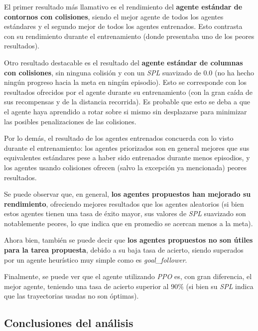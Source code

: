 \newpage

El primer resultado más llamativo es el rendimiento del \textbf{agente estándar de contornos con colisiones}, siendo el mejor agente de todos los agentes estándares y el segundo mejor de todos los agentes entrenados. Esto contrasta con su rendimiento durante el entrenamiento (donde presentaba uno de los peores resultados).

Otro resultado destacable es el resultado del \textbf{agente estándar de columnas con colisiones}, sin ninguna colisión y con un \textit{SPL} suavizado de 0.0 (no ha hecho ningún progreso hacia la meta en ningún episodio). Esto se corresponde con los resultados ofrecidos por el agente durante su entrenamiento (con la gran caída de sus recompensas y de la distancia recorrida). Es probable que esto se deba a que el agente haya aprendido a rotar sobre si mismo sin desplazarse para minimizar las posibles penalizaciones de las colisiones.

Por lo demás, el resultado de los agentes entrenados concuerda con lo visto durante el entrenamiento: los agentes priorizados son en general mejores que sus equivalentes estándares pese a haber sido entrenados durante menos episodios, y los agentes usando colisiones ofrecen (salvo la excepción ya mencionada) peores resultados.

Se puede observar que, en general, \textbf{los agentes propuestos han mejorado su rendimiento}, ofreciendo mejores resultados que los agentes aleatorios (si bien estos agentes tienen una tasa de éxito mayor, sus valores de \textit{SPL} suavizado son notablemente peores, lo que indica que en promedio se acercan menos a la meta).

Ahora bien, también se puede decir que \textbf{los agentes propuestos no son útiles para la tarea propuesta}, debido a su baja tasa de acierto, siendo superados por un agente heurístico muy simple como es \textit{goal{\_}follower}.

Finalmente, se puede ver que el agente utilizando \textit{PPO} es, con gran diferencia, el mejor agente, teniendo una tasa de acierto superior al $90\%$ (si bien su \textit{SPL} indica que las trayectorias usadas no son óptimas).

\subsection{Conclusiones del análisis}

